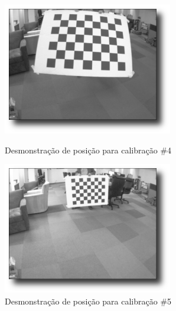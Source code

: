 \begin{figure}[H]
  \includegraphics[width=\linewidth]{Imagens/figura3-17.png}
  \caption{Desmonstração de posição para calibração \#4 \cite{Documentacao-CalibrateMonocularCamera}}\label{fig3:17}
\endminipage\hfill
{}
  \includegraphics[width=\linewidth]{Imagens/figura3-18.png}
  \caption{Desmonstração de posição para calibração \#5 \cite{Documentacao-CalibrateMonocularCamera}}\label{fig3:18}
\endminipage\hfill
{}

\end{figure}
